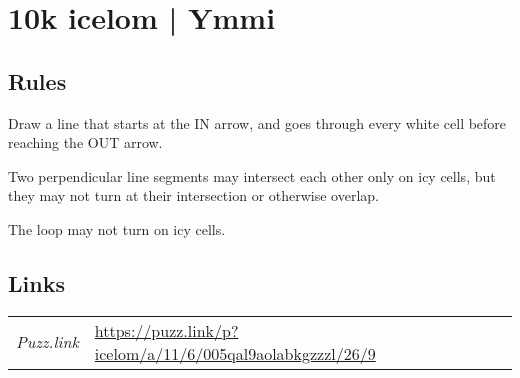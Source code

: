 \section{10k icelom | {\normalfont Ymmi}}
\label{sec:08-10k-icelom-ymmi}

\subsection*{Rules}
\begin{markdown}
Draw a line that starts at the IN arrow, and goes through every white cell before reaching the OUT arrow.

Two perpendicular line segments may intersect each other only on icy cells, but they may not turn at their intersection or otherwise overlap.

The loop may not turn on icy cells.
\end{markdown}
\subsection*{Links}
\begin{tabularx}{\textwidth}{l X}
\emph{Puzz.link} & \url{https://puzz.link/p?icelom/a/11/6/005qal9aolabkgzzzl/26/9} \\
\end{tabularx}
\pagebreak
